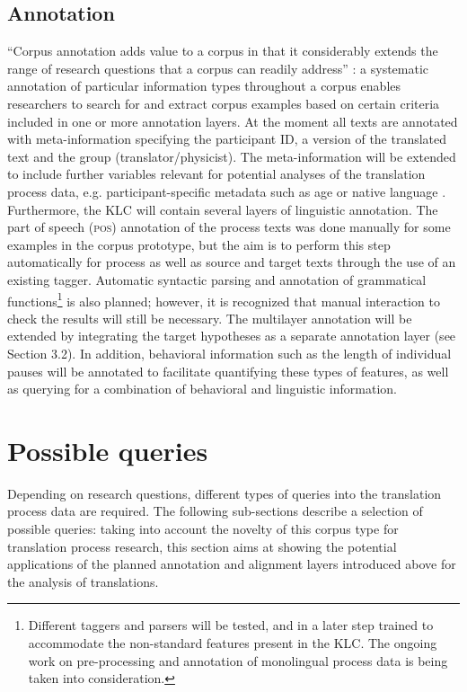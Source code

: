\documentclass[output=paper]{LSP/langsci}
\begin{document}
\subsection{Annotation}
“Corpus annotation adds value to a corpus in that it considerably extends the range of research questions that a corpus can readily address” \citep[29]{McEnery2006}: a systematic annotation of particular information types throughout a corpus enables researchers to search for and extract corpus examples based on certain criteria included in one or more annotation layers. At the moment all texts are annotated with meta-information specifying the participant ID, a version of the translated text and the group (translator/physicist). The meta-information will be extended to include further variables relevant for potential analyses of the translation process data, e.g. participant-specific metadata such as age or native language \citep[see][]{Hvelplund2012}. Furthermore, the KLC will contain several layers of linguistic annotation. The part of speech (\textsc{pos}) annotation of the process texts was done manually for some examples in the corpus prototype, but the aim is to perform this step automatically for process as well as source and target texts through the use of an existing tagger. Automatic syntactic parsing and annotation of grammatical functions\footnote{Different taggers and parsers will be tested, and in a later step trained to accommodate the non-standard features present in the KLC. The ongoing work on pre-processing and annotation of monolingual process data \citep{Leijten2012,Macken2012} is being taken into consideration.} is also planned; however, it is recognized that manual interaction to check the results will still be necessary. The multilayer annotation \citep[see][]{Hansen-Schirra2006} will be extended by integrating the target hypotheses as a separate annotation layer (see Section 3.2). In addition, behavioral information such as the length of individual pauses \citep[see][]{Alves2009,Alves2011} will be annotated to facilitate quantifying these types of features, as well as querying for a combination of behavioral and linguistic information.

\section{Possible queries}
Depending on research questions, different types of queries into the translation process data are required. The following sub-sections describe a selection of possible queries: taking into account the novelty of this corpus type for translation process research, this section aims at showing the potential applications of the planned annotation and alignment layers introduced above for the analysis of translations.
\end{document}
